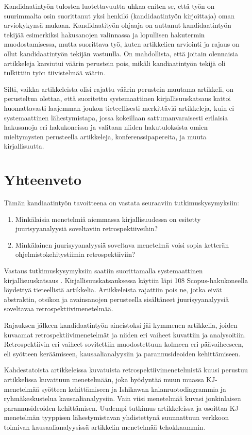 Kandidaatintyön tulosten luotettavuutta uhkaa eniten se, että työn on suurimmalta osin suorittanut yksi henkilö (kandidaatintyön kirjoittaja) oman arviokykynsä mukaan. Kandidaatityön ohjaaja on auttanut kandidaatintyön tekijää esimerkiksi hakusanojen valinnassa ja lopullisen hakutermin muodostamisessa, mutta suorittava työ, kuten artikkelien arviointi ja rajaus on ollut kandidaatintyön tekijän vastuulla. On mahdollista, että joitain olennaisia artikkeleja karsiutui väärin perustein pois, mikäli kandiaatintyön tekijä oli tulkittiin työn tiivistelmää väärin.

Silti, vaikka artikkeleista olisi rajattu väärin perustein muutama artikkeli, on perusteltua olettaa, että suoritettu systemaattinen kirjallisuuskatsaus kattoi huomattavasti laajemman joukon tieteellisesti merkittäviä artikkeleja, kuin ei-systemaattinen lähestymistapa, jossa kokeillaan sattumanvaraisesti erilaisia hakusanoja eri hakukoneissa ja valitaan niiden hakutuloksista omien mieltymysten perusteella artikkeleja, konferenssipapereita, ja muuta kirjallisuutta.

\section{Yhteenveto}
Tämän kandiaatintyön tavoitteena on vastata seuraaviin tutkimuskysymyksiin:
\begin{enumerate}
\item Minkälaisia menetelmiä aiemmassa kirjallisuudessa on esitetty juurisyyanalyysiä soveltaviin retrospektiiveihin?
\item Minkälainen juurisyyanalyysiä soveltava menetelmä voisi sopia ketterän ohjelmistokehitystiimin retrospektiiviin?
\end{enumerate}
Vastaus tutkimuskysymyksiin saatiin suorittamalla systemaattinen kirjallisuuskatsaus \citep{Kitchenham2007}. Kirjallisuuskatsauksessa käytiin läpi 108 Scopus-hakukoneella löydettyä tieteellistä artikkelia. Artikkeleista rajattiin pois ne, jotka eivät abstraktin, otsikon ja avainsanojen perusteella sisältäneet juurisyyanalyysiä soveltavaa retrospektiivimenetelmää.

Rajauksen jälkeen kandidaatintyön aineistoksi jäi kymmenen artikkelia, joiden kuvaamat retrospektiivimenetelmät ja niiden eri vaiheet kuvattiin ja analysoitiin. Retrospektiivin eri vaiheet sovitettiin muodostettuun kolmeen eri päävaiheeseen, eli syötteen keräämiseen, kausaalianalyysiin ja parannusideoiden kehittämiseen. 

Kahdestatoista artikkeleissa kuvatuista retrospektiivimenetelmistä kuusi perustuu artikkelissa \citep{birk2002postmortem} kuvattuun menetelmään, joka hyödyntää muun muassa KJ-menetelmää syötteen kehittämiseen ja Ishikawan kalanruotodiagrammia ja ryhmäkeskustelua kausaalianalyysiin. Vain viisi menetelmää kuvasi jonkinlaisen parannusideoiden kehittämisen. Uudempi tutkimus artikkeleissa \citep{Bjornson2009} ja \citep{Lehtinen2011} osoittaa KJ-menetelmän tyyppisen lähestymistavan yhdistettynä suunnattuun verkkoon toimivan kausaalianalyysissä artikkelin \citep{birk2002postmortem} menetelmää tehokkaammin.

